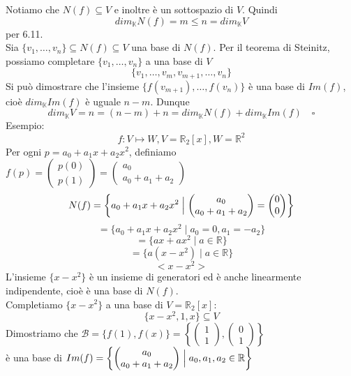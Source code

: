 \documentclass[12pt]{article}
\begin{document}
Notiamo che $N(f) \subseteq V$ e inoltre è un sottospazio di $V$. Quindi
\[dim_{\mathbb{K}}N(f) = m \le n = dim_{\mathbb{K}}V\]
per 6.11. \\
Sia $\{v_1, \dots, v_n\} \subseteq N(f) \subseteq V$ una base di $N(f)$. Per il teorema di Steinitz, possiamo completare $\{v_1, \dots, v_n\}$ a una base di $V$ \[\{v_1,\dots,v_m, v_{m+1}, \dots, v_n\}\]
Si può dimostrare che l'insieme $\{f(v_{m+1}), \dots, f(v_n)\}$ è una base di $Im(f)$, cioè $dim_{\mathbb{K}}Im(f)$ è uguale $n-m$. Dunque
\[dim_{\mathbb{K}}V = n = (n-m) + n = dim_{\mathbb{K}}N(f) + dim_{\mathbb{K}}Im(f) \quad \square\]
Esempio:
\[f: V \mapsto W, V = \mathbb{R}_2[x], W = \mathbb{R}^2\]
Per ogni $p = a_0 + a_1x + a_2x^2$, definiamo $f(p) = \begin{pmatrix}
    p(0)\\
    p(1)
\end{pmatrix} = \begin{pmatrix}
    a_0\\
    a_0 + a_1 + a_2
\end{pmatrix}$
\[N(f) = \left\{a_0 + a_1x + a_2x^2 \Bigm\vert \begin{pmatrix}
    a_0\\
    a_0 + a_1 + a_2
\end{pmatrix}= \begin{pmatrix}
    0\\
    0
\end{pmatrix}\right\}\]
\[= \{a_0 + a_1x + a_2x^2 \mid a_0 = 0, a_1 = -a_2\}\]
\[= \{ax + ax^2 \mid a \in \mathbb{R}\}\]
\[= \{a(x-x^2) \mid a \in \mathbb{R}\}\]
\[<x-x^2>\]
L'insieme $\{x-x^2\}$ è un insieme di generatori ed è anche linearmente indipendente, cioè è una base di $N(f)$.\\
Completiamo $\{x-x^2\}$ a una base di $V = \mathbb{R}_2[x]$:
\[\{x-x^2, 1, x\} \subseteq V\]
Dimostriamo che $\mathcal{B} = \{f(1), f(x)\} = \left\{\begin{pmatrix}
    1\\
    1
\end{pmatrix}, \begin{pmatrix}
    0\\
    1
\end{pmatrix}\right\}$\\
è una base di $Im(f) = \left\{\begin{pmatrix}
    a_0\\
    a_0 + a_1 + a_2
\end{pmatrix} \Bigm\vert a_0, a_1, a_2 \in \mathbb{R} \right\}$\\\\
\end{document}
